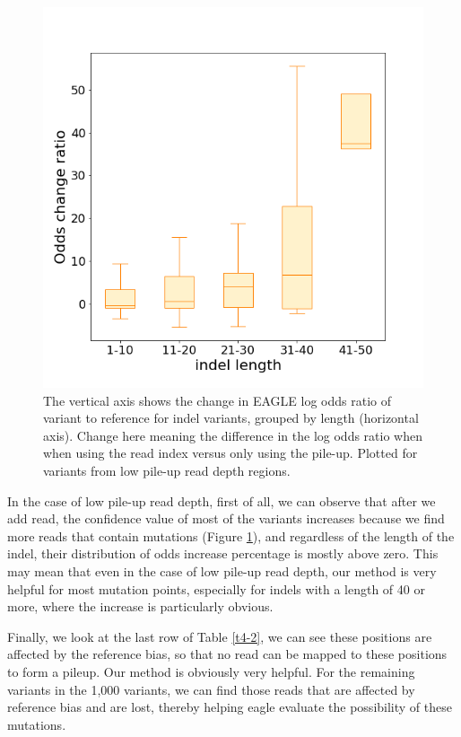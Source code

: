 \vspace{1cm}
\begin{figure}[H]
    \centering
    \includegraphics[width=0.6\columnwidth]{body/image/4-5.png}
    \captionsetup{labelfont=bf}
    \renewcommand{\baselinestretch}{1.0}
    \caption[low pile-up read depth odds change ratio]{The vertical axis shows the change in EAGLE log odds ratio of variant to reference for indel variants, grouped by length (horizontal axis).  Change here meaning the difference in the log odds ratio when when using the read index versus only using the pile-up.  Plotted for variants from low pile-up read depth regions.}
    \label{f4-5}
\end{figure}

In the case of low pile-up read depth, first of all, we can observe that after we add read, the confidence value of most of the variants increases because we find more reads that contain mutations (Figure \ref{f4-5}), and regardless of the length of the indel, their distribution of odds increase percentage is mostly above zero.
This may mean that even in the case of low pile-up read depth, our method is very helpful for most mutation points, especially for indels with a length of 40 or more, where the increase is particularly obvious.

Finally, we look at the last row of Table \ref{t4-2}, we can see these positions are affected by the reference bias, so that no read can be mapped to these positions to form a pileup. Our method is obviously very helpful. For the remaining variants in the 1,000 variants, we can find those reads that are affected by reference bias and are lost, thereby helping eagle evaluate the possibility of these mutations.

